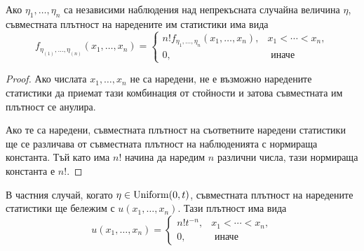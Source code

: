 \documentclass[numbers=endperiod, DIV=15, bibliography=totocnumbered]{scrartcl}
\begin{document}
\begin{proposition}
  Ако $\eta_1, \ldots, \eta_n$ са независими наблюдения над непрекъсната случайна величина $\eta$, съвместната плътност на наредените им статистики има вида
  \begin{displaymath}
    f_{\eta_{(1)}, \ldots, \eta_{(n)}} (x_1, \ldots, x_n)
    =
    \begin{cases}
      n! f_{\eta_{1}, \ldots, \eta_{n}} (x_1, \ldots, x_n), &x_1 < \cdots < x_n, \\
      0, &\text{ иначе}
    \end{cases}
  \end{displaymath}
\end{proposition}
\begin{proof}
  Ако числата $x_1, \ldots, x_n$ не са наредени, не е възможно наредените статистики да приемат тази комбинация от стойности и затова съвместната им плътност се анулира.

  Ако те са наредени, съвместната плътност на съответните наредени статистики ще се различава от съвместната плътност на наблюденията с нормираща константа. Тъй като има $n$! начина да наредим $n$ различни числа, тази нормираща константа е $n$!.
\end{proof}

\begin{note}
  В частния случай, когато $\eta \in \operatorname{Uniform}(0, t)$, съвместната плътност на наредените статистики ще бележим с $u(x_1, \ldots, x_n)$. Тази плътност има вида
  \begin{displaymath}
    u(x_1, \ldots, x_n)
    =
    \begin{cases}
      n! t^{-n}, &x_1 < \cdots < x_n, \\
      0, &\text{ иначе}
    \end{cases}
  \end{displaymath}
\end{note}
\end{document}
